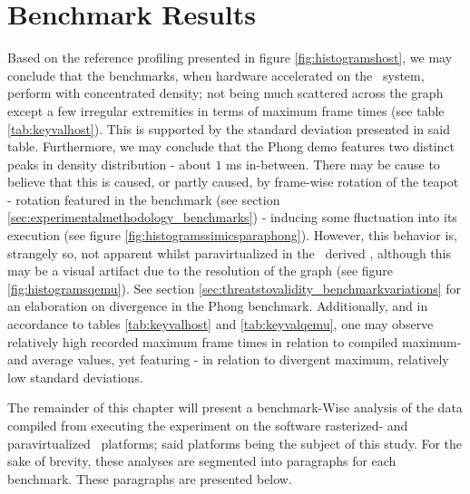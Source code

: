\section{Benchmark Results}
\label{sec:results_benchmarkresults}
Based on the reference profiling presented in figure \ref{fig:histogramshost}, we may conclude that the benchmarks, when hardware accelerated on the \dvttermhost\ system, perform with concentrated density; not being much scattered across the graph except a few irregular extremities in terms of maximum frame times (see table \ref{tab:keyvalhost}).
This is supported by the standard deviation presented in said table.
Furthermore, we may conclude that the Phong demo features two distinct peaks in density distribution - about $1$ ms in-between.
There may be cause to believe that this is caused, or partly caused, by frame-wise rotation of the teapot - rotation featured in the benchmark (see section \ref{sec:experimentalmethodology_benchmarks}) - inducing some fluctuation into its execution (see figure \ref{fig:histogramssimicsparaphong}).
However, this behavior is, strangely so, not apparent whilst paravirtualized in the \dvttermqemu\ derived \dvttermandroidemulator , although this may be a visual artifact due to the resolution of the graph (see figure \ref{fig:histogramsqemu}).
See section \ref{sec:threatstovalidity_benchmarkvariations} for an elaboration on divergence in the Phong benchmark.
Additionally, and in accordance to tables \ref{tab:keyvalhost} and \ref{tab:keyvalqemu}, one may observe relatively high recorded maximum frame times in relation to compiled maximum- and average values, yet featuring - in relation to divergent maximum, relatively low standard deviations.

The remainder of this chapter will present a benchmark-Wise analysis of the data compiled from executing the experiment on the software rasterized- and paravirtualized \dvttermsimics\ platforms; said platforms being the subject of this study.
For the sake of brevity, these analyses are segmented into paragraphs for each benchmark.
These paragraphs are presented below.













